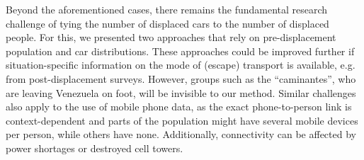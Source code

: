 \documentclass[sn-basic]{sn-jnl}%
\begin{document}

Beyond the aforementioned cases, there remains the fundamental research challenge of tying the number of displaced cars to the number of displaced people. For this, we presented two approaches that rely on pre-displacement population and car distributions. These approaches could be improved further if situation-specific information on the mode of (escape) transport is available, e.g. from post-displacement surveys. However, groups such as the ``caminantes'', who are leaving Venezuela on foot, will be invisible to our method. Similar challenges also apply to the use of mobile phone data, as the exact phone-to-person link is context-dependent and parts of the population might have several mobile devices per person, while others have none. Additionally, connectivity can be affected by power shortages or destroyed cell towers.


\end{document}
